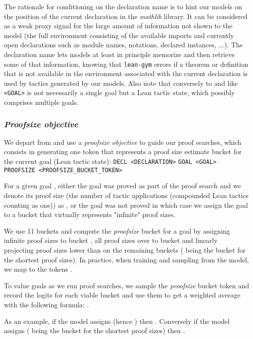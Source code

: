 \documentclass[nohyperref]{article}
\theoremstyle{plain}
\theoremstyle{definition}
\theoremstyle{remark}
\begin{document}
The rationale for conditioning on the declaration name is to hint our models on the position of the current declaration in the \textit{mathlib} library. It can be considered as a weak proxy signal for the large amount of information not shown to the model (the full environment consisting of the available imports and currently open declarations such as module names, notations, declared instances, ...). The declaration name lets models at least in principle memorize and then retrieve some of that information, knowing that \texttt{lean-gym} errors if a theorem or definition that is not available in the environment associated with the current declaration is used by tactics generated by our models. Also note that conversely to \citet{polu2020generative} and like \citet{han2021proof} \texttt{<GOAL>} is not necessarily a single goal but a Lean tactic state, which possibly comprises multiple goals.

\subsubsection{\textit{Proofsize objective}}
\label{proofsize}

We depart from \citet{polu2020generative} and use a \textit{proofsize objective} to guide our proof searches, which consists in generating one token that represents a proof size estimate bucket for the current goal (Lean tactic state): \verb|DECL <DECLARATION>| \verb|GOAL <GOAL>| \verb|PROOFSIZE <PROOFSIZE_BUCKET_TOKEN>|

For a given goal , either the goal was proved as part of the proof search and we denote its proof size (the number of tactic applications (compounded Lean tactics counting as one)) as , or the goal was not proved in which case we assign the goal to a bucket that virtually represents "infinite" proof sizes.

We use 11 buckets  and compute the \textit{proofsize} bucket  for a goal  by assigning infinite proof sizes to bucket , all proof sizes over  to bucket  and linearly projecting proof sizes lower than  on the remaining buckets  ( being the bucket for the shortest proof sizes). In practice, when training and sampling from the model, we map  to the tokens .

To value goals as we run proof searches, we sample the \textit{proofsize} bucket token and record the logits  for each viable bucket and use them to get a weighted average with the following formula: .

As an example, if the model assigns  (hence ) then . Conversely if the model assigns  ( being the bucket for the shortest proof sizes) then .
\end{document}
